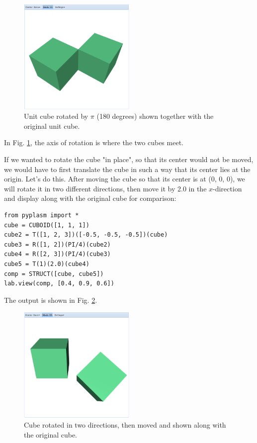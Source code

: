 \documentclass[article,A4,12pt]{llncs}
\begin{document}
\begin{figure}[!ht]
\begin{center}
\includegraphics[width=0.5\textwidth]{img/rot-1.png}
\end{center}
\vspace{-2mm}
\caption{Unit cube rotated by $\pi$ (180 degrees) shown together with the original unit cube.}
\label{fig:rot-1}
\end{figure}
\noindent
In Fig. \ref{fig:rot-1}, the axis of rotation is where the two cubes meet. 

If we wanted to 
rotate the cube "in place", so that its center would not be moved,
we would have to first translate the cube in such a way that its center
lies at the origin. Let's do this. After moving the cube so that 
its center is at (0, 0, 0), we will rotate it in two different directions,
then move it by 2.0 in the $x$-direction and display along with 
the original cube for comparison:

\begin{verbatim}
from pyplasm import *
cube = CUBOID([1, 1, 1])
cube2 = T([1, 2, 3])([-0.5, -0.5, -0.5])(cube)
cube3 = R([1, 2])(PI/4)(cube2)
cube4 = R([2, 3])(PI/4)(cube3)
cube5 = T(1)(2.0)(cube4)
comp = STRUCT([cube, cube5])
lab.view(comp, [0.4, 0.9, 0.6])
\end{verbatim}
The output is shown in Fig. \ref{fig:rot-2}.
\newpage

\begin{figure}[!ht]
\begin{center}
\includegraphics[width=0.5\textwidth]{img/rot-2.png}
\end{center}
\vspace{-2mm}
\caption{Cube rotated in two directions, then moved and shown along with the original cube.}
\label{fig:rot-2}
\end{figure}
\end{document}
